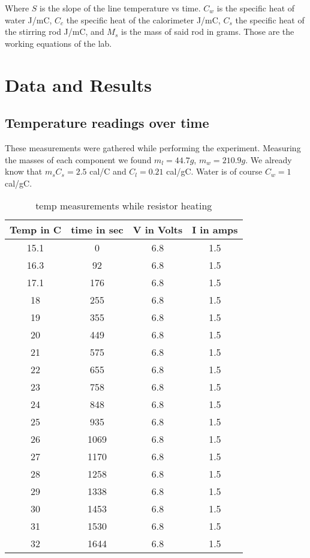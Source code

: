 \documentclass[a4paper,12pt]{article}
\begin{document}
Where $S$ is the slope of the line temperature vs time. $C_w$ is the specific heat of water J/mC, $C_c$ the specific heat of the calorimeter J/mC, $C_s$ the specific heat of the stirring rod J/mC, and $M_s$ is the mass of said rod in grams. Those are the working equations of the lab. 

\section{Data and Results}

\subsection{Temperature readings over time}

These measurements were gathered while performing the experiment. Measuring the masses of each component we found $m_l = 44.7 g$, $m_w = 210.9 g$. We already know that $m_sC_s = 2.5$ cal/C and $C_l = 0.21$ cal/gC. Water is of course $C_w = 1$ cal/gC.

\begin{table}[ht]
\caption{temp measurements while resistor heating}
\centering
\begin{tabular} {c c c c}
\hline\hline
 Temp in C & time in sec & V in Volts & I in amps \\ [0.5ex]
\hline
15.1 & 0 & 6.8 & 1.5 \\
16.3 & 92 & 6.8 & 1.5 \\
17.1 & 176 & 6.8 & 1.5 \\
18 & 255 & 6.8 & 1.5 \\
19 & 355 & 6.8 & 1.5 \\
20 & 449 & 6.8 & 1.5 \\
21 & 575 & 6.8 & 1.5 \\
22 & 655 & 6.8 & 1.5 \\
23 & 758 & 6.8 & 1.5 \\
24 & 848 & 6.8 & 1.5 \\
25 & 935 & 6.8 & 1.5 \\
26 & 1069 & 6.8 & 1.5 \\
27 & 1170 & 6.8 & 1.5 \\
28 & 1258 & 6.8 & 1.5 \\
29 & 1338 & 6.8 & 1.5 \\
30 & 1453 & 6.8 & 1.5 \\
31 & 1530 & 6.8 & 1.5 \\
32 & 1644 & 6.8 & 1.5 \\
\hline
\end{tabular}
\end{table}
\end{document}
